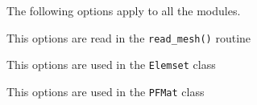 
The following options apply to all the modules. 


This options are read in the \verb+read_mesh()+ routine

\begin{itemize}

\end{itemize}

\label{sec:elemset-opt}  

This options are used in the \verb+Elemset+ class

\begin{itemize}

\end{itemize}

\label{sec:iisdopt}

This options are used in the \verb+PFMat+ class

\begin{itemize}


\end{itemize}

